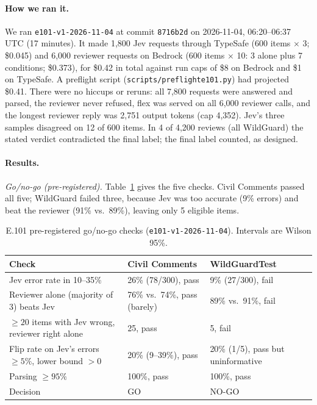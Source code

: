 \documentclass[11pt]{article}
\renewcommand{\_}{\origunderscore\allowbreak}
\begin{document}
\paragraph{How we ran it.}
We ran \texttt{e101-v1-2026-11-04} at commit \texttt{8716b2d} on 2026-11-04, 06:20--06:37 UTC (17 minutes). It made 1,800 Jev requests through TypeSafe (600 items $\times$ 3; \$0.045) and 6,000 reviewer requests on Bedrock (600 items $\times$ 10: 3 alone plus 7 conditions; \$0.373), for \$0.42 in total against run caps of \$8 on Bedrock and \$1 on TypeSafe. A preflight script (\texttt{scripts/preflight\_e101.py}) had projected \$0.41. There were no hiccups or reruns: all 7,800 requests were answered and parsed, the reviewer never refused, flex was served on all 6,000 reviewer calls, and the longest reviewer reply was 2,751 output tokens (cap 4,352). Jev's three samples disagreed on 12 of 600 items. In 4 of 4,200 reviews (all WildGuard) the stated verdict contradicted the final label; the final label counted, as designed.

\paragraph{Results.}
\emph{Go/no-go (pre-registered).} Table~\ref{tab:e101-gonogo} gives the five checks. Civil Comments passed all five; WildGuard failed three, because Jev was too accurate (9\% errors) and beat the reviewer (91\% vs.\ 89\%), leaving only 5 eligible items.

\begin{table}[H]
\centering
\small
\caption{E.101 pre-registered go/no-go checks (\texttt{e101-v1-2026-11-04}). Intervals are Wilson 95\%.}
\label{tab:e101-gonogo}
\begin{tabularx}{\textwidth}{X l l}
\toprule
Check & Civil Comments & WildGuardTest \\
\midrule
Jev error rate in 10--35\% & 26\% (78/300), pass & 9\% (27/300), fail \\
Reviewer alone (majority of 3) beats Jev & 76\% vs.\ 74\%, pass (barely) & 89\% vs.\ 91\%, fail \\
$\geq 20$ items with Jev wrong, reviewer right alone & 25, pass & 5, fail \\
Flip rate on Jev's errors $\geq 5\%$, lower bound $> 0$ & 20\% (9--39\%), pass & 20\% (1/5), pass but uninformative \\
Parsing $\geq 95\%$ & 100\%, pass & 100\%, pass \\
\midrule
Decision & GO & NO-GO \\
\bottomrule
\end{tabularx}
\end{table}
\end{document}
